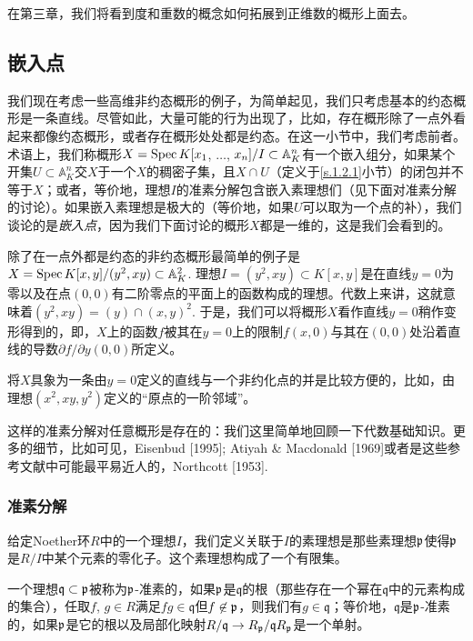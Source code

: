 在第三章，我们将看到度和重数的概念如何拓展到正维数的概形上面去。

\subsection{嵌入点}

我们现在考虑一些高维非约态概形的例子，为简单起见，我们只考虑基本的约态概形是一条直线。\nottran 尽管如此，大量可能的行为出现了，比如，存在概形除了一点外看起来都像约态概形，或者存在概形处处都是约态。在这一小节中，我们考虑前者。术语上，我们称概形$X=\operatorname{Spec} K[x_1$, $\dots$, $x_n]/I\subset \mathbb{A}_{K}^n$有一个嵌入组分，如果某个开集$U\subset \mathbb{A}^n_K$交$X$于一个$X$的稠密子集，且$X\cap U$（定义于\ref{s.1.2.1}小节）的闭包并不等于$X$；或者，等价地，理想$I$的准素分解包含嵌入素理想们（见下面对准素分解的讨论）。如果嵌入素理想是极大的（等价地，如果$U$可以取为一个点的补），我们谈论的是\textit{嵌入点}，因为我们下面讨论的概形$X$都是一维的，这是我们会看到的。\nottran

除了在一点外都是约态的非约态概形最简单的例子是$X=\operatorname{Spec} K[x,y]/(y^2,xy)\subset \mathbb{A}_K^2$. 理想$I=(y^2,xy)\subset K[x,y]$是在直线$y=0$为零以及在点$(0,0)$有二阶零点的平面上的函数构成的理想。代数上来讲，这就意味着$(y^2,xy)=(y)\cap (x,y)^2$. 于是，我们可以将概形$X$看作直线$y=0$稍作变形得到的，即，$X$上的函数$f$被其在$y=0$上的限制$f(x,0)$与其在$(0,0)$处沿着直线的导数$\partial f/\partial y(0,0)$所定义。

将$X$具象为一条由$y=0$定义的直线与一个非约化点的并是比较方便的，比如，由理想$(x^2,xy,y^2)$定义的“原点的一阶邻域”。


这样的准素分解对任意概形是存在的：我们这里简单地回顾一下代数基础知识。更多的细节，比如可见，Eisenbud [1995]; Atiyah \& Macdonald [1969]或者是这些参考文献中可能最平易近人的，Northcott [1953].

\subsubsection*{准素分解}

给定Noether环$R$中的一个理想$I$，我们定义关联于$I$的素理想是那些素理想$\mathfrak{p}$使得$\mathfrak{p}$是$R/I$中某个元素的零化子。这个素理想构成了一个有限集。

一个理想$\mathfrak{q}\subset \mathfrak{p}$被称为$\mathfrak{p}$-准素的，如果$\mathfrak{p}$是$\mathfrak{q}$的根（那些存在一个幂在$\mathfrak{q}$中的元素构成的集合），任取$f$, $g\in R$满足$fg\in \mathfrak{q}$但$f\not\in \mathfrak{p}$，则我们有$g\in\mathfrak{q}$；等价地，$\mathfrak{q}$是$\mathfrak{p}$-准素的，如果$\mathfrak{p}$是它的根以及局部化映射$R/\mathfrak{q}\to R_{\mathfrak{p}}/\mathfrak{q}R_{\mathfrak{p}}$是一个单射。

